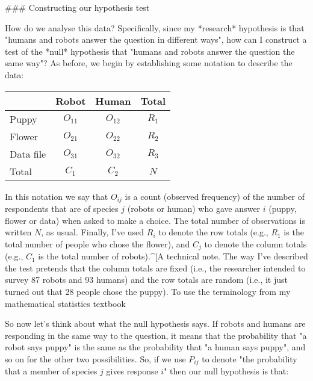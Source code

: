 ### Constructing our hypothesis test

How do we analyse this data? Specifically, since my *research* hypothesis is that "humans and robots answer the question in different ways", how can I construct a test of the *null* hypothesis that "humans and robots answer the question the same way"? As before, we begin by establishing some notation to describe the data:
\begin{center}
\begin{tabular}{l|cc|c}
          & Robot & Human & Total \\ \hline
Puppy     & $O_{11}$  & $O_{12}$ & $R_{1}$ \\
Flower    & $O_{21}$ & $O_{22}$ & $R_{2}$ \\
Data file & $O_{31}$  & $O_{32}$ & $R_{3}$ \\ \hline
Total     & $C_{1}$ & $C_{2}$ & $N$
\end{tabular}
\end{center}


In this notation we say that $O_{ij}$ is a count (observed frequency) of the number of respondents that are of species $j$ (robots or human) who gave answer $i$ (puppy, flower or data) when asked to make a choice. The total number of observations is written $N$, as usual. Finally, I've used $R_i$ to denote the row totals (e.g., $R_1$ is the total number of people who chose the flower), and $C_j$ to denote the column totals (e.g., $C_1$ is the total number of robots).^[A technical note. The way I've described the test pretends that the column totals are fixed (i.e., the researcher intended to survey 87 robots and 93 humans) and the row totals are random (i.e., it just turned out that 28 people chose the puppy). To use the terminology from my mathematical statistics textbook \cite{Hogg2005] I should technically refer to this situation as a chi-square test of homogeneity; and reserve the term chi-square test of independence for the situation where both the row and column totals are random outcomes of the experiment. In the initial drafts of this book that's exactly what I did. However, it turns out that these two tests are identical; and so I've collapsed them together.}

So now let's think about what the null hypothesis says. If robots and humans are responding in the same way to the question, it means that the probability that "a robot says puppy" is the same as the probability that "a human says puppy", and so on for the other two possibilities. So, if we use $P_{ij}$ to denote "the probability that a member of species $j$ gives response $i$" then our null hypothesis is that:

